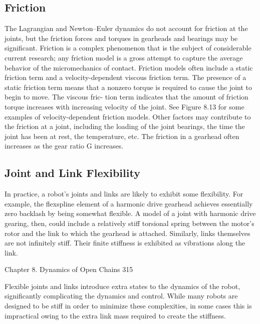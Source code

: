\documentclass[12pt,a4paper]{article}
\begin{document}
\subsection{Friction}
The Lagrangian and Newton–Euler dynamics do not account for friction at
the joints, but the friction forces and torques in gearheads and bearings may be
significant. Friction is a complex phenomenon that is the subject of considerable
current research; any friction model is a gross attempt to capture the average
behavior of the micromechanics of contact.
    Friction models often include a static friction term and a velocity-dependent
viscous friction term. The presence of a static friction term means that a
nonzero torque is required to cause the joint to begin to move. The viscous fric-
tion term indicates that the amount of friction torque increases with increasing
velocity of the joint. See Figure 8.13 for some examples of velocity-dependent
friction models.
    Other factors may contribute to the friction at a joint, including the loading
of the joint bearings, the time the joint has been at rest, the temperature, etc.
The friction in a gearhead often increases as the gear ratio G increases.

\subsection{Joint and Link Flexibility}
In practice, a robot’s joints and links are likely to exhibit some flexibility. For
example, the flexspline element of a harmonic drive gearhead achieves essentially
zero backlash by being somewhat flexible. A model of a joint with harmonic
drive gearing, then, could include a relatively stiff torsional spring between the
motor’s rotor and the link to which the gearhead is attached.
    Similarly, links themselves are not infinitely stiff. Their finite stiffness is
exhibited as vibrations along the link.


Chapter 8. Dynamics of Open Chains                                                                  315

    Flexible joints and links introduce extra states to the dynamics of the robot,
significantly complicating the dynamics and control. While many robots are
designed to be stiff in order to minimize these complexities, in some cases this
is impractical owing to the extra link mass required to create the stiffness.
\end{document}
